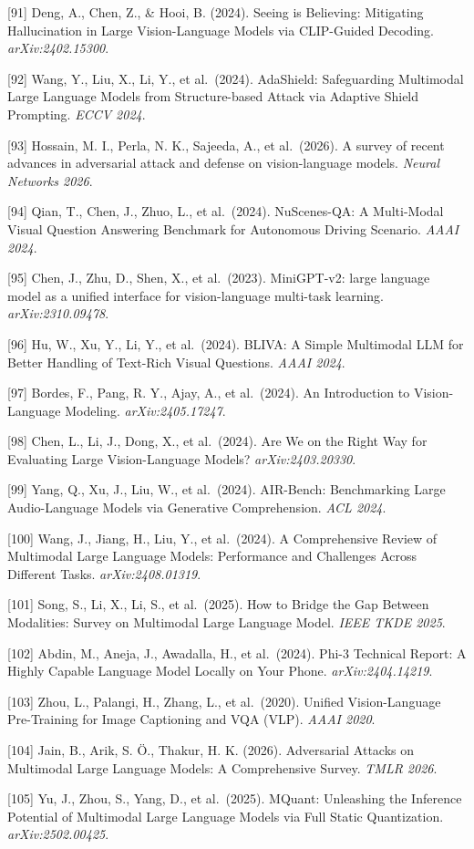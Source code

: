 {[}91{]} Deng, A., Chen, Z., \& Hooi, B. (2024). Seeing is Believing: Mitigating Hallucination in Large Vision-Language Models via CLIP-Guided Decoding. \emph{arXiv:2402.15300}.

{[}92{]} Wang, Y., Liu, X., Li, Y., et al.~(2024). AdaShield: Safeguarding Multimodal Large Language Models from Structure-based Attack via Adaptive Shield Prompting. \emph{ECCV 2024}.

{[}93{]} Hossain, M. I., Perla, N. K., Sajeeda, A., et al.~(2026). A survey of recent advances in adversarial attack and defense on vision-language models. \emph{Neural Networks 2026}.

{[}94{]} Qian, T., Chen, J., Zhuo, L., et al.~(2024). NuScenes-QA: A Multi-Modal Visual Question Answering Benchmark for Autonomous Driving Scenario. \emph{AAAI 2024}.

{[}95{]} Chen, J., Zhu, D., Shen, X., et al.~(2023). MiniGPT-v2: large language model as a unified interface for vision-language multi-task learning. \emph{arXiv:2310.09478}.

{[}96{]} Hu, W., Xu, Y., Li, Y., et al.~(2024). BLIVA: A Simple Multimodal LLM for Better Handling of Text-Rich Visual Questions. \emph{AAAI 2024}.

{[}97{]} Bordes, F., Pang, R. Y., Ajay, A., et al.~(2024). An Introduction to Vision-Language Modeling. \emph{arXiv:2405.17247}.

{[}98{]} Chen, L., Li, J., Dong, X., et al.~(2024). Are We on the Right Way for Evaluating Large Vision-Language Models? \emph{arXiv:2403.20330}.

{[}99{]} Yang, Q., Xu, J., Liu, W., et al.~(2024). AIR-Bench: Benchmarking Large Audio-Language Models via Generative Comprehension. \emph{ACL 2024}.

{[}100{]} Wang, J., Jiang, H., Liu, Y., et al.~(2024). A Comprehensive Review of Multimodal Large Language Models: Performance and Challenges Across Different Tasks. \emph{arXiv:2408.01319}.

{[}101{]} Song, S., Li, X., Li, S., et al.~(2025). How to Bridge the Gap Between Modalities: Survey on Multimodal Large Language Model. \emph{IEEE TKDE 2025}.

{[}102{]} Abdin, M., Aneja, J., Awadalla, H., et al.~(2024). Phi-3 Technical Report: A Highly Capable Language Model Locally on Your Phone. \emph{arXiv:2404.14219}.

{[}103{]} Zhou, L., Palangi, H., Zhang, L., et al.~(2020). Unified Vision-Language Pre-Training for Image Captioning and VQA (VLP). \emph{AAAI 2020}.

{[}104{]} Jain, B., Arik, S. Ö., Thakur, H. K. (2026). Adversarial Attacks on Multimodal Large Language Models: A Comprehensive Survey. \emph{TMLR 2026}.

{[}105{]} Yu, J., Zhou, S., Yang, D., et al.~(2025). MQuant: Unleashing the Inference Potential of Multimodal Large Language Models via Full Static Quantization. \emph{arXiv:2502.00425}.
